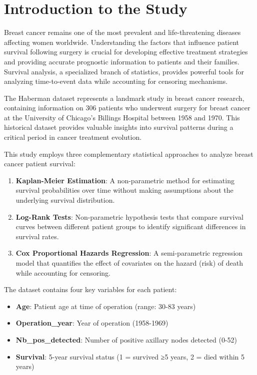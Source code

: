 \documentclass[12pt,a4paper]{article}
\begin{document}
\section{Introduction to the Study}

Breast cancer remains one of the most prevalent and life-threatening diseases affecting women worldwide. Understanding the factors that influence patient survival following surgery is crucial for developing effective treatment strategies and providing accurate prognostic information to patients and their families. Survival analysis, a specialized branch of statistics, provides powerful tools for analyzing time-to-event data while accounting for censoring mechanisms.

The Haberman dataset represents a landmark study in breast cancer research, containing information on 306 patients who underwent surgery for breast cancer at the University of Chicago's Billings Hospital between 1958 and 1970. This historical dataset provides valuable insights into survival patterns during a critical period in cancer treatment evolution.

This study employs three complementary statistical approaches to analyze breast cancer patient survival:

\begin{enumerate}
    \item \textbf{Kaplan-Meier Estimation}: A non-parametric method for estimating survival probabilities over time without making assumptions about the underlying survival distribution.
    \item \textbf{Log-Rank Tests}: Non-parametric hypothesis tests that compare survival curves between different patient groups to identify significant differences in survival rates.
    \item \textbf{Cox Proportional Hazards Regression}: A semi-parametric regression model that quantifies the effect of covariates on the hazard (risk) of death while accounting for censoring.
\end{enumerate}

The dataset contains four key variables for each patient:
\begin{itemize}
    \item \textbf{Age}: Patient age at time of operation (range: 30-83 years)
    \item \textbf{Operation\_year}: Year of operation (1958-1969)
    \item \textbf{Nb\_pos\_detected}: Number of positive axillary nodes detected (0-52)
    \item \textbf{Survival}: 5-year survival status (1 = survived ≥5 years, 2 = died within 5 years)
\end{itemize}
\end{document}

